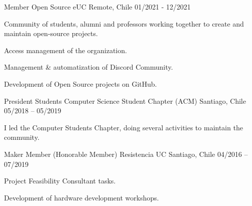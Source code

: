 

\begin{cventries}

  \cventry
  {Member} %
  {Open Source eUC} %
  {Remote, Chile} %
  {01/2021 - 12/2021} %
  {
    \begin{cvitems} %
      \item {Community of students, alumni and professors working together to create and maintain open-source projects.}
      \item {Access management of the organization.}
      \item {Management \& automatization of Discord Community.}
      \item {Development of Open Source projects on GitHub.}
    \end{cvitems}
  }

  \cventry
  {President} %
  {Students Computer Science Student Chapter (ACM)} %
  {Santiago, Chile} %
  {05/2018 – 05/2019} %
  {
    \begin{cvitems} %
      \item {I led the Computer Students Chapter, doing several activities to maintain the community.}
    \end{cvitems}
  }


  \cventry
  {Maker Member (Honorable Member)} %
  {Resistencia UC} %
  {Santiago, Chile} %
  {04/2016 – 07/2019} %
  {
    \begin{cvitems} %
      \item {Project Feasibility Consultant tasks.}
      \item {Development of hardware development workshops.}
    \end{cvitems}
  }


\end{cventries}
